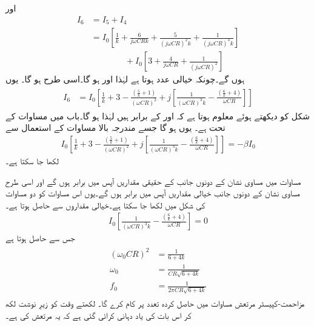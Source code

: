 اور
\begin{align*}
I_6 &=I_5 + I_4 \\
&=I_0 \left[\frac{1}{k}+\frac{6}{j \omega C R k}+\frac{5}{\left(j \omega C  R\right )^2 k} +\frac{1}{\left(j \omega C  R\right )^3 k}\right] \\
& \qquad \qquad +I_0 \left[3+\frac{4}{j \omega C R}+\frac{1}{\left (j \omega C R \right )^2} \right]
\end{align*}
ہوں گے۔چونکہ خیالی عدد  ہوتا ہے لہٰذا  اور  ہو گا۔اسی طرح  ہو گا۔ یوں
\begin{gather}
\begin{aligned} \label{مساوات_مزاحمت_کپیسٹر_بار_کی_رو}
I_6&=I_0 \left[ \frac{1}{k}+3 -\frac{\left(\frac{5}{k}+1 \right )}{\left(\omega C R \right)^2}+j \left [\frac{1}{\left (\omega C R \right)^3 k}  -\frac{\left(\frac{6}{k}+4 \right)}{\omega C R}\right] \right ]
\end{aligned}
\end{gather}
شکل کو دیکھتے ہوئے معلوم ہوتا ہے کہ  اور  کے برابر ہیں لہٰذا  ہو گا۔باب  میں مساوات  کے تحت  ہے۔ یوں  ہو گا جسے مندرجہ بالا مساوات کے استعمال سے
\begin{align} \label{مساوات_مزاحمت_کپیسٹر_مکمل_مساوت}
I_0 \left[ \frac{1}{k}+3 -\frac{\left(\frac{5}{k}+1 \right )}{\left(\omega C R \right)^2}+j \left [\frac{1}{\left (\omega C R \right)^3 k}  -\frac{\left(\frac{6}{k}+4 \right)}{\omega C R}\right] \right ]=-\beta I_0
\end{align}
لکھا جا سکتا ہے۔

مساوات  میں مساوی نشان کے دونوں جانب کے حقیقی مقداریں آپس میں برابر ہوں گے اور اسی طرح مساوی نشان کے دونوں جانب خیالی مقداریں آپس میں برابر ہوں گے۔یوں اس مساوات کو دو مساوات کی شکل میں لکھا جا سکتا ہے۔خیالی مقداروں سے حاصل ہوتا ہے۔
\begin{align*}
I_0 \left[\frac{1}{\left( \omega C R\right)^3 k }-\frac{\left(\frac{6}{k}+4 \right)}{\omega C R} \right]=0
\end{align*}
جس سے حاصل ہوتا ہے
\begin{gather}
\begin{aligned} \label{مساوات_مزاحمت_کپیسٹر_مرتعش_قدرتی_تعداد_ارتعاش}
\left(\omega_0 C R \right)^2 &=\frac{1}{ {6+4 k}}\\
\omega_0 &= \frac{1}{C R \sqrt {6+4 k}} \\
f_0 &=\frac{1}{2 \pi C R \sqrt{6+4 k}}
\end{aligned}
\end{gather}
مزاحمت-کپیسٹر مرتعش مساوات  میں حاصل کردہ تعدد  پر کام کرے گا۔ لکھتے وقت  کو زیرِ نوشت لکھ کر اس بات کی یاد دہانی کرائی گئی ہے کہ یہ مرتعش کی  ہے۔ 


